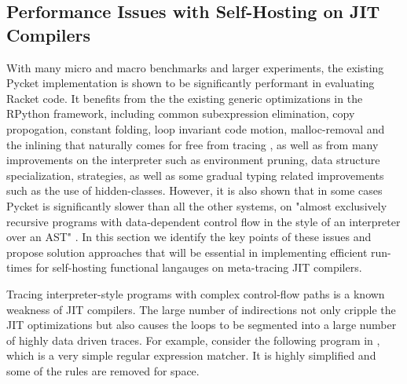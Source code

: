 
\subsection{Performance Issues with Self-Hosting on JIT Compilers}
\label{subsec:performance}

With many micro and macro benchmarks and larger experiments, the
existing Pycket implementation is shown to be significantly performant
in evaluating Racket code. It benefits from the the existing generic
optimizations in the RPython framework, including common subexpression
elimination, copy propogation, constant folding, loop invariant code
motion, malloc-removal and the inlining that naturally comes for free
from tracing \cite{loop-aware:12, hotpath:06, malloc-removal:11}, as
well as from many improvements on the interpreter such as environment
pruning, data structure specialization, strategies, as well as some
gradual typing related improvements such as the use of
hidden-classes. However, it is also shown that in some cases Pycket is
significantly slower than all the other systems, on "almost
exclusively recursive programs with data-dependent control flow in the
style of an interpreter over an AST" \cite{pycket15, pycket17}. In
this section we identify the key points of these issues and propose
solution approaches that will be essential in implementing efficient
run-times for self-hosting functional langauges on meta-tracing JIT
compilers.

Tracing interpreter-style programs with complex control-flow paths is
a known weakness of JIT compilers. The large number of indirections
not only cripple the JIT optimizations but also causes the loops to be
segmented into a large number of highly data driven traces. For
example, consider the following program in , which
is a very simple regular expression matcher. It is highly simplified
and some of the rules are removed for space.

